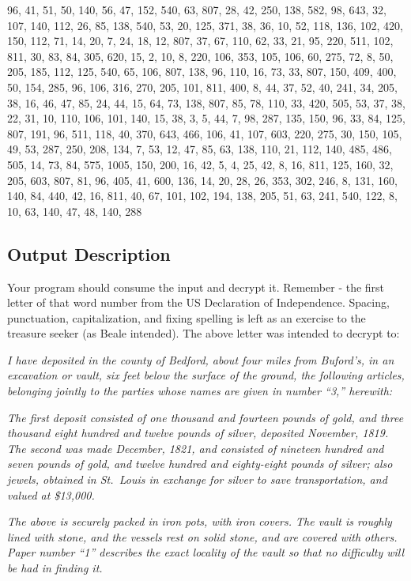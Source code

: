 96, 41, 51, 50, 140, 56, 47, 152, 540, 63, 807, 28, 42, 250, 138, 582,
98, 643, 32, 107, 140, 112, 26, 85, 138, 540, 53, 20, 125, 371, 38, 36,
10, 52, 118, 136, 102, 420, 150, 112, 71, 14, 20, 7, 24, 18, 12, 807,
37, 67, 110, 62, 33, 21, 95, 220, 511, 102, 811, 30, 83, 84, 305, 620,
15, 2, 10, 8, 220, 106, 353, 105, 106, 60, 275, 72, 8, 50, 205, 185,
112, 125, 540, 65, 106, 807, 138, 96, 110, 16, 73, 33, 807, 150, 409,
400, 50, 154, 285, 96, 106, 316, 270, 205, 101, 811, 400, 8, 44, 37, 52,
40, 241, 34, 205, 38, 16, 46, 47, 85, 24, 44, 15, 64, 73, 138, 807, 85,
78, 110, 33, 420, 505, 53, 37, 38, 22, 31, 10, 110, 106, 101, 140, 15,
38, 3, 5, 44, 7, 98, 287, 135, 150, 96, 33, 84, 125, 807, 191, 96, 511,
118, 40, 370, 643, 466, 106, 41, 107, 603, 220, 275, 30, 150, 105, 49,
53, 287, 250, 208, 134, 7, 53, 12, 47, 85, 63, 138, 110, 21, 112, 140,
485, 486, 505, 14, 73, 84, 575, 1005, 150, 200, 16, 42, 5, 4, 25, 42, 8,
16, 811, 125, 160, 32, 205, 603, 807, 81, 96, 405, 41, 600, 136, 14, 20,
28, 26, 353, 302, 246, 8, 131, 160, 140, 84, 440, 42, 16, 811, 40, 67,
101, 102, 194, 138, 205, 51, 63, 241, 540, 122, 8, 10, 63, 140, 47, 48,
140, 288

\subsection{Output Description}\label{output-description-12}

Your program should consume the input and decrypt it. Remember - the
first letter of that word number from the US Declaration of
Independence. Spacing, punctuation, capitalization, and fixing spelling
is left as an exercise to the treasure seeker (as Beale intended). The
above letter was intended to decrypt to:

\emph{I have deposited in the county of Bedford, about four miles from
Buford's, in an excavation or vault, six feet below the surface of the
ground, the following articles, belonging jointly to the parties whose
names are given in number ``3,'' herewith:}

\emph{The first deposit consisted of one thousand and fourteen pounds of
gold, and three thousand eight hundred and twelve pounds of silver,
deposited November, 1819. The second was made December, 1821, and
consisted of nineteen hundred and seven pounds of gold, and twelve
hundred and eighty-eight pounds of silver; also jewels, obtained in
St.~Louis in exchange for silver to save transportation, and valued at
\$13,000.}

\emph{The above is securely packed in iron pots, with iron covers. The
vault is roughly lined with stone, and the vessels rest on solid stone,
and are covered with others. Paper number ``1'' describes the exact
locality of the vault so that no difficulty will be had in finding it.}

